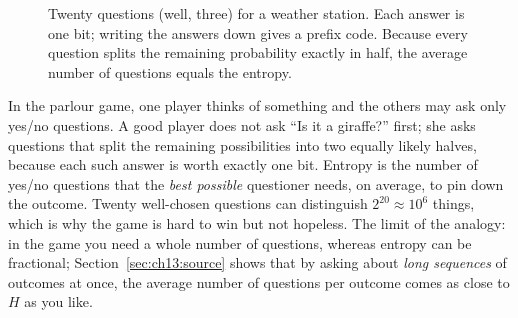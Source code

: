 \begin{figure}[htbp]\centering
{}
\caption{Twenty questions (well, three) for a weather station. Each answer is one bit; writing
the answers down gives a prefix code. Because every question splits the remaining probability
exactly in half, the average number of questions equals the entropy.}
\label{fig:ch13_questions}
\end{figure}

\begin{analogy}
In the parlour game, one player thinks of something and the others may ask only yes/no
questions. A good player does not ask ``Is it a giraffe?'' first; she asks questions that split
the remaining possibilities into two equally likely halves, because each such answer is worth
exactly one bit. Entropy is the number of yes/no questions that the \emph{best possible}
questioner needs, on average, to pin down the outcome. Twenty well-chosen questions can
distinguish $2^{20}\approx10^6$ things, which is why the game is hard to win but not hopeless.
The limit of the analogy: in the game you need a whole number of questions, whereas entropy can be
fractional; Section~\ref{sec:ch13:source} shows that by asking about \emph{long sequences} of
outcomes at once, the average number of questions per outcome comes as close to $H$ as you like.
\end{analogy}

